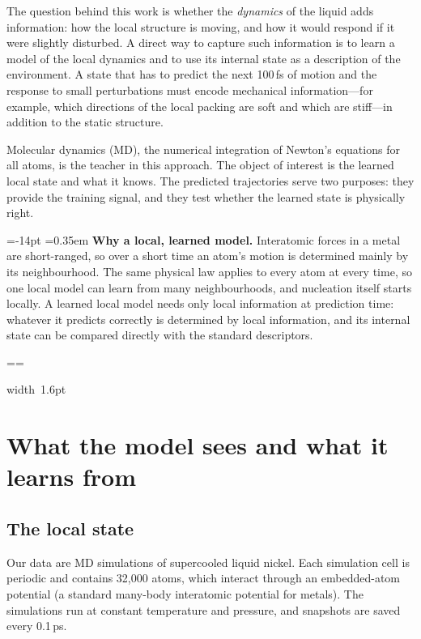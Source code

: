 \documentclass[11pt,a4paper]{article}
\makeatletter
\numberwithin{equation}{section}
\newcommand{\pcmWhyPiece}[1]{%
  \noindent\hbox{{\color{pcmAmber}\vrule width 1.6pt}%
    \setlength{\fboxsep}{7pt}\colorbox{pcmAmber!5}{\vbox{\unvbox#1}}}\par}
\newcommand{\pcmWhyEmit}{%
  \vbadness=10000
  \loop
    \par
    \ifdim\pagegoal=\maxdimen
      \pcmWhyAvail=\dimexpr\vsize-14pt\relax
    \else
      \pcmWhyAvail=\dimexpr\pagegoal-\pagetotal-19pt\relax
    \fi
    \ifdim\dimexpr\ht\pcmWhyAll+\dp\pcmWhyAll\relax>\pcmWhyAvail
      \ifdim\pcmWhyAvail<3\baselineskip
        \newpage
      \else
        \setbox\pcmWhyPart\vsplit\pcmWhyAll to \pcmWhyAvail
        \pcmWhyPiece\pcmWhyPart
      \fi
    \else
      \pcmWhyPiece\pcmWhyAll
    \fi
  \ifvoid\pcmWhyAll\else\repeat}
\newenvironment{why}[1][Why]{%
  \par\addvspace{.55em}%
  \setbox\pcmWhyAll\vbox\bgroup
    \hsize=\dimexpr\linewidth-1.6pt-14pt\relax
    \@parboxrestore\fussy
    \parskip=0.35em\relax
    \noindent\textcolor{pcmAmber}{\bfseries #1.}\enspace\ignorespaces}%
 {\par\egroup
  \splittopskip=\topskip\splitmaxdepth=\maxdepth
  \pcmWhyEmit
  \par\addvspace{.55em}}
\makeatother
\begin{document}
The question behind this work is whether the \emph{dynamics} of the liquid adds
information: how the local structure is moving, and how it would respond if it
were slightly disturbed. A direct way to capture such information is to learn a
model of the local dynamics and to use its internal state as a description of the
environment. A state that has to predict the next 100\,fs of motion and the
response to small perturbations must encode mechanical information---for
example, which directions of the local packing are soft and which are
stiff---in addition to the static structure.

Molecular dynamics (MD), the numerical integration of Newton's equations for all
atoms, is the teacher in this approach. The object of interest is the learned
local state and what it knows. The predicted trajectories serve two purposes:
they provide the training signal, and they test whether the learned state is
physically right.

\begin{why}[Why a local, learned model]
Interatomic forces in a metal are short-ranged, so over a short time an atom's
motion is determined mainly by its neighbourhood. The same physical law applies
to every atom at every time, so one local model can learn from many
neighbourhoods, and nucleation itself starts locally. A learned local model needs
only local information at prediction time: whatever it predicts correctly is
determined by local information, and its internal state can be compared directly
with the standard descriptors.
\end{why}

\section{What the model sees and what it learns from}
\label{sec:data}

\subsection{The local state}

Our data are MD simulations of supercooled liquid nickel. Each simulation cell is
periodic and contains 32,000 atoms, which interact through an embedded-atom
potential (a standard many-body interatomic potential for metals). The
simulations run at constant temperature and pressure, and snapshots are saved
every 0.1\,ps.
\end{document}
